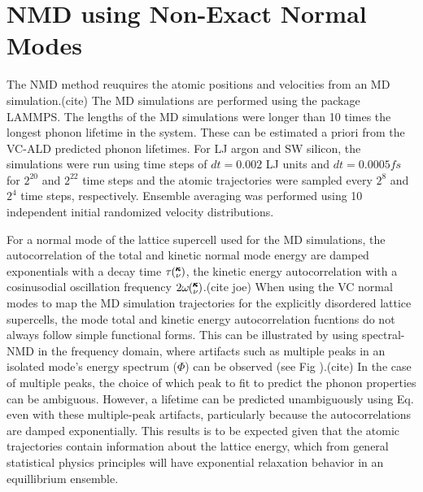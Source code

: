 \documentclass[aps,prb,onecolumn,preprint,superscriptaddress,amsmath,amssymb,floatfix]{revtex4}
\newcommand{\kv}{\mspace{-4.0mu}\left(\mspace{-8.0mu}
\begin{smallmatrix}&\pmb{\kappa} \\&\nu\end{smallmatrix}
\mspace{-3.0mu}\right)}
\begin{document}

\section{\label{A:NMD XCORR}
NMD using Non-Exact Normal Modes}

The NMD method reuquires the atomic positions and velocities  
from an MD simulation.(cite) 
The MD simulations are performed using the package LAMMPS.
\cite{plimpton_fast_1995} The lengths of the MD simulations were longer 
than 10 times the longest phonon lifetime in the system. These can 
be estimated a priori from the VC-ALD predicted phonon lifetimes. For LJ 
argon and SW silicon, the simulations were run using time steps of 
$dt=0.002$ LJ units and $dt = 0.0005 fs$ for $2^20$ and 
$2^22$ time steps and the atomic trajectories were sampled 
every $2^8$ and $2^4$ time steps, respectively. 
Ensemble averaging was performed using 10 independent initial 
randomized velocity distributions. 

For a normal mode of the lattice supercell 
used for the MD simulations, 
the autocorrelation of the total and kinetic     
normal mode energy are damped exponentials 
with a decay time $\tau\kv$, the kinetic energy autocorrelation with a 
cosinusodial oscillation frequency 
$2\omega\kv$.(cite joe) 
When using the VC normal modes to map the MD simulation 
trajectories for the explicitly disordered lattice supercells, 
the mode total and kinetic energy autocorrelation fucntions 
do not always follow simple functional forms. 
This can be illustrated by using spectral-NMD 
in the frequency domain, where artifacts such as 
multiple peaks in an isolated mode's 
energy spectrum ($\Phi$) can be observed (see Fig ).(cite)  
In the case 
of multiple peaks, the choice of which peak to fit to predict the phonon 
properties can be ambiguous.  However, 
a lifetime can be predicted unambiguously using Eq. even with 
these multiple-peak artifacts, particularly because the autocorrelations 
are damped exponentially. This results is to be expected 
given that the atomic trajectories contain 
information about the lattice energy, which from general statistical 
physics principles will have exponential relaxation behavior in an 
equillibrium ensemble.
\cite{srivastava_physics_1990,landau_statistical_1980,
rajabpour_thermal_2010}
\end{document}
